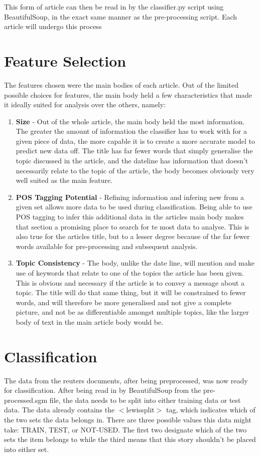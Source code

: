 \documentclass[11pt]{article}
\begin{document}
This form of article can then be read in by the classifier.py script using BeautifulSoup, in the exact same manner as the pre-processing script. Each article will undergo this process

\section{Feature Selection}
The features chosen were the main bodies of each article. Out of the limited possible choices for features, the main body held a few characteristics that made it ideally suited for analysis over the others, namely:

\begin{enumerate}
\item \textbf{Size} - Out of the whole article, the main body held the most information. The greater the amount of information the classifier has to work with for a given piece of data, the more capable it is to create a more accurate model to predict new data off. The title has far fewer words that simply generalise the topic discussed in the article, and the dateline has information that doesn’t necessarily relate to the topic of the article, the body becomes obviously very well suited as the main feature.

\item \textbf{POS Tagging Potential} - Refining information and infering new from a given set allows more data to be used during classification. Being able to use POS tagging to infer this additional data in the articles main body makes that section a promising place to search for te most data to analyse. This is also true for the articles title, but to a lesser degree because of the far fewer words available for pre-processing and subsequent analysis.

\item \textbf{Topic Consistency} - The body, unlike the date line, will mention and make use of keywords that relate to one of the topics the article has been given. This is obvious and necessary if the article is to convey a message about a topic. The title will do that same thing, but it will be constrained to fewer words, and will therefore be more generalised and not give a complete picture, and not be as differentiable amongst multiple topics, like the larger body of text in the main article body would be.
\end{enumerate}

\section{Classification}
The data from the reuters documents, after being preprocessed, was now ready for classification. After being read in by BeautifulSoup from the pre-processed.sgm file, the data needs to be split into either training data or test data. The data already contains the $<$lewissplit$>$ tag, which indicates which of the two sets the data belongs in. There are three possible values this data might take: TRAIN, TEST, or NOT-USED. The first two designate which of the two sets the item belongs to while the third means that this story shouldn’t be placed into either set. \\
\end{document}
